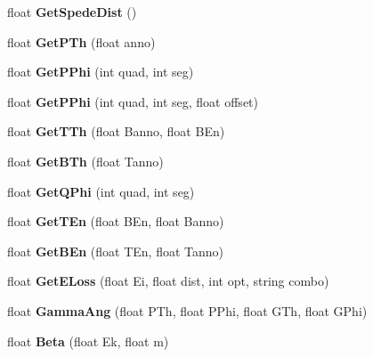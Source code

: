 \begin{DoxyCompactItemize}
float {\bfseries Get\+Spede\+Dist} ()
\item 
\mbox{\label{classdoppler_a1415bdb47dbb9d5eba7f14a64bd3693e}} 
float {\bfseries Get\+P\+Th} (float anno)
\item 
\mbox{\label{classdoppler_a0f57a8f4a8c369c14d52e62dd3833f2e}} 
float {\bfseries Get\+P\+Phi} (int quad, int seg)
\item 
\mbox{\label{classdoppler_ac8f059cc77214a954be534a85c748a3c}} 
float {\bfseries Get\+P\+Phi} (int quad, int seg, float offset)
\item 
\mbox{\label{classdoppler_a7865dcf92a6b18d23cb48e9e624e505b}} 
float {\bfseries Get\+T\+Th} (float Banno, float B\+En)
\item 
\mbox{\label{classdoppler_ac834d80156ae80009b508ae41fedde3d}} 
float {\bfseries Get\+B\+Th} (float Tanno)
\item 
\mbox{\label{classdoppler_a7c3afd05ed9ddb8c5bedc0de905acd0b}} 
float {\bfseries Get\+Q\+Phi} (int quad, int seg)
\item 
\mbox{\label{classdoppler_a31a09afe8920dc1302162ec8e0be9302}} 
float {\bfseries Get\+T\+En} (float B\+En, float Banno)
\item 
\mbox{\label{classdoppler_a182d987ddc6db4a8b8e7f7821bda3846}} 
float {\bfseries Get\+B\+En} (float T\+En, float Tanno)
\item 
\mbox{\label{classdoppler_a64570ec784dabd6e17cf836489450527}} 
float {\bfseries Get\+E\+Loss} (float Ei, float dist, int opt, string combo)
\item 
\mbox{\label{classdoppler_a6dca381f91f2267abefadd62cf66f69f}} 
float {\bfseries Gamma\+Ang} (float P\+Th, float P\+Phi, float G\+Th, float G\+Phi)
\item 
\mbox{\label{classdoppler_a28eb084d224fdb58fda1d6f6c61dd232}} 
float {\bfseries Beta} (float Ek, float m)
\item 
\mbox{\label{classdoppler_a7f08d93d2bfa269f8c22ac71b604b09a}} 

\end{DoxyCompactItemize}
